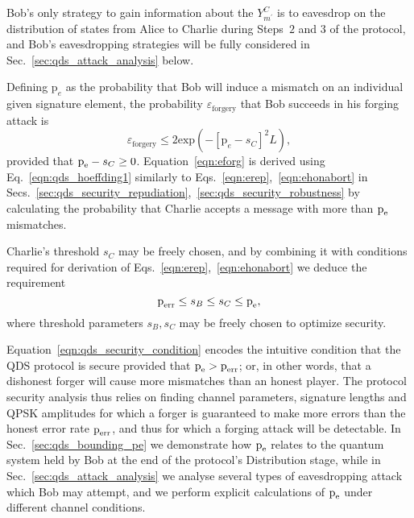 Bob's only strategy to gain information about the $Y_{m^\prime}^C$ is to eavesdrop on the distribution of states from Alice to Charlie during Steps~$2$ and $3$ of the protocol, and Bob's eavesdropping strategies will be fully considered in Sec.~\ref{sec:qds_attack_analysis} below.

Defining $\text{p}_e$ as the probability that Bob will induce a mismatch on an individual given signature element, the probability $\varepsilon_{\text{forgery}}$ that Bob succeeds in his forging attack is
\begin{equation}\label{eqn:eforg}
\varepsilon_{\text{forgery}} \le 2 \text{exp}\left( - \left[\text{p}_e - s_C\right]^2 L\right), 
\end{equation}
provided that $\text{p}_{\text{e}} - s_C \ge 0$. Equation~\ref{eqn:eforg} is derived using Eq.~\ref{eqn:qds_hoeffding1} similarly to Eqs.~\ref{eqn:erep},~\ref{eqn:ehonabort} in Secs.~\ref{sec:qds_security_repudiation},~\ref{sec:qds_security_robustness} by calculating the probability that Charlie accepts a message with more than $\text{p}_{\text{e}}$ mismatches.

Charlie's threshold $s_C$ may be freely chosen, and by combining it with conditions required for derivation of Eqs.~\ref{eqn:erep},~\ref{eqn:ehonabort} we deduce the requirement
\begin{equation}\label{eqn:qds_security_condition}
\text{p}_{\text{err}} \le s_B \le s_C \le \text{p}_{\text{e}},
\end{equation}
where threshold parameters $s_B, s_C$ may be freely chosen to optimize security. 

Equation~\ref{eqn:qds_security_condition} encodes the intuitive condition that the QDS protocol is secure provided that $\text{p}_{\text{e}} > \text{p}_{\text{err}}$; or, in other words, that a dishonest forger will cause more mismatches than an honest player. The protocol security analysis thus relies on finding channel parameters, signature lengths and QPSK amplitudes for which a forger is guaranteed to make more errors than the honest error rate $\text{p}_{\text{err}}$, and thus for which a forging attack will be detectable. In Sec.~\ref{sec:qds_bounding_pe} we demonstrate how $\text{p}_{\text{e}}$ relates to the quantum system held by Bob at the end of the protocol's Distribution stage, while in Sec.~\ref{sec:qds_attack_analysis} we analyse several types of eavesdropping attack which Bob may attempt, and we perform explicit calculations of $\text{p}_{\text{e}}$ under different channel conditions.


